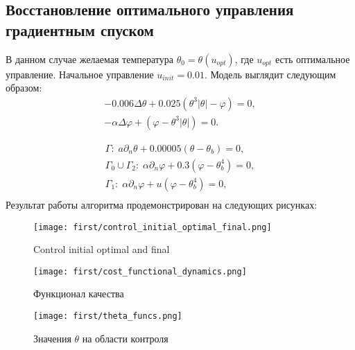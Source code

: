 \documentclass[12pt,a4paper]{article}%
\begin{document}
\subsection{Восстановление оптимального управления градиентным спуском}
    В данном случае желаемая температура $\theta_0 = \theta(u_{opt})$, где $u_{opt}$ есть оптимальное управление. Начальное управление $u_{init} = 0.01$.
    Модель выглядит следующим образом:
        \begin{equation}
        \label{initial}
        \begin{aligned}
            - 0.006 \Delta \theta + 0.025 (\theta ^ 3 | \theta | - \varphi) = 0,  \\
            - \alpha \Delta \varphi + (\varphi - \theta ^3 | \theta |) = 0.
        \end{aligned}
    \end{equation}

    \begin{equation}
        \label{initial_boundary}
        \begin{aligned}
            \Gamma: \; a \partial_n \theta + 0.00005 (\theta - \theta _b) = 0, \\
            \Gamma_0 \cup \Gamma_2: \; \alpha \partial_n \varphi + 0.3 (\varphi - \theta_b ^4 ) = 0, \\
            \Gamma_1: \; \alpha \partial_n \varphi + u(\varphi - \theta_b ^4 ) = 0, \\
        \end{aligned}
    \end{equation}
    Результат работы алгоритма продемонстрирован на следующих рисунках:


\begin{figure}
  \texttt{[image: first/control\_initial\_optimal\_final.png]}
  \caption{Control initial optimal and final}
  \label{fig1:control}
\end{figure}


\begin{figure}
  \texttt{[image: first/cost\_functional\_dynamics.png]}
  \caption{Функционал качества}
  \label{fig1:cost}
\end{figure}


\begin{figure}
  \texttt{[image: first/theta\_funcs.png]}
  \caption{Значения $\theta$ на области контроля}
  \label{fig1:theta}
\end{figure}
\end{document}
